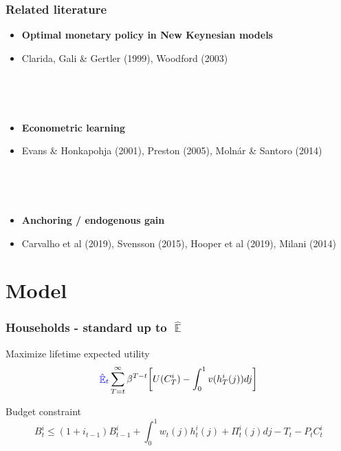 \documentclass[11pt]{beamer}
\DeclareMathOperator{\E}{\mathbb{E}}
\begin{document}
\begin{frame}
	\frametitle{Related literature}

\begin{itemize}
\item \textbf{Optimal monetary policy in New Keynesian models}
\item[] Clarida, Gali \& Gertler (1999), Woodford (2003)

\

\

\item \textbf{Econometric learning}
\item[] Evans \& Honkapohja (2001), Preston (2005), Moln\'ar \& Santoro (2014)

\

\

\item \textbf{Anchoring / endogenous gain} 
\item[] Carvalho et al (2019), Svensson (2015), Hooper et al (2019), Milani (2014)
\end{itemize}



\end{frame}

\section{Model}

\begin{frame}
	\frametitle{Households - standard up to $\hat{\E}$}
	\label{HH}

Maximize lifetime expected utility
\begin{equation}
\textcolor{blue}{\hat{\E}_t}\sum^{\infty}_{T=t}\beta^{T-t} \bigg[ U(C^i_T) - \int_0^1 v(h^i_T(j)) dj \bigg]
\label{lifetime_U}
\end{equation}	

Budget constraint
\begin{equation}
 B^i_t \leq (1+i_{t-1})B^i_{t-1} + \int_0^1 w_t(j)h^i_t(j) + \Pi_t^i(j)  dj-T_t -P_tC^i_t
 \label{BC}
\end{equation}



\vfill

\hyperlink{details_HHs_firms}{}
\end{frame}
\end{document}
